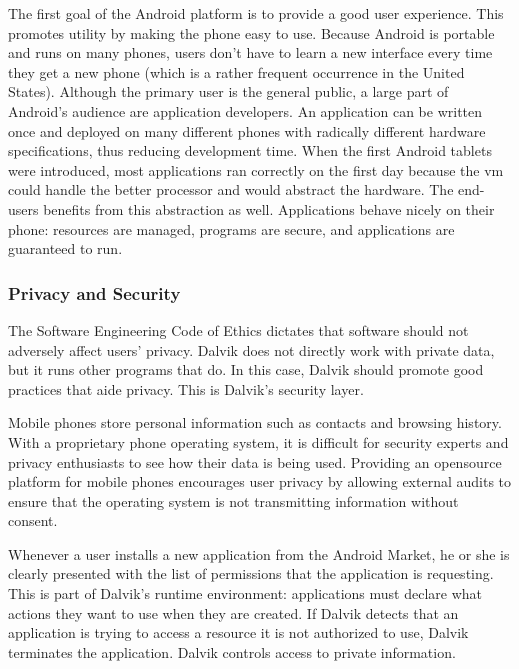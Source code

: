 \documentclass[11pt]{article}
\begin{document}
\begin{multicols}{2}
The first goal of the Android platform is to provide a good user experience.
This promotes utility by making the phone easy to use.  Because Android is
portable and runs on many phones, users don't have to learn a new interface
every time they get a new phone (which is a rather frequent occurrence in the
United States).  Although the primary user is the general public, a large part
of Android's audience are application developers.  An application can be written
once and deployed on many different phones with radically different hardware
specifications, thus reducing development time.  When the first Android tablets
were introduced, most applications ran correctly on the first day because the
\gls{vm} could handle the better processor and would abstract the hardware.  The
end-users benefits from this abstraction as well.  Applications behave nicely on
their phone: resources are managed, programs are secure, and applications are
guaranteed to run.


\subsubsection{Privacy and Security} %
\label{ssub:privacy}

The Software Engineering Code of Ethics dictates that software should not
adversely affect users' privacy.  Dalvik does not directly work with private
data, but it runs other programs that do.  In this case, Dalvik should promote
good practices that aide privacy.  This is Dalvik's security layer.

Mobile phones store personal information such as contacts and browsing history.
With a proprietary phone operating system, it is difficult for security experts
and privacy enthusiasts to see how their data is being used.  Providing an
\gls{opensource} platform for mobile phones encourages user privacy by allowing
external audits to ensure that the operating system is not transmitting
information without consent.

Whenever a user installs a new application from the Android Market, he or she is
clearly presented with the list of permissions that the application is
requesting.  This is part of Dalvik's runtime environment: applications must
declare what actions they want to use when they are created.  If Dalvik detects
that an application is trying to access a resource it is not authorized to use,
Dalvik terminates the application.  Dalvik controls access to private
information.


\end{multicols}
\end{document}
